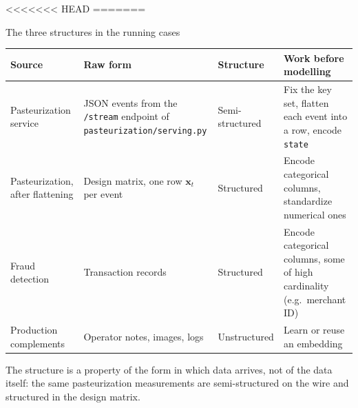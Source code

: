 <<<<<<< HEAD
=======
\begin{frame}{The three structures in the running cases}
\begingroup\footnotesize
\renewcommand{\arraystretch}{1.4}
\begin{tabularx}{\textwidth}{>{\raggedright\arraybackslash}p{} >{\raggedright\arraybackslash}X l >{\raggedright\arraybackslash}X}
\bfseries Source & \bfseries Raw form & \bfseries Structure & \bfseries Work before modelling \\
\toprule
Pasteurization service & JSON events from the \texttt{/stream} endpoint of \texttt{pasteurization/serving.py} & Semi-structured & Fix the key set, flatten each event into a row, encode \texttt{state} \\
Pasteurization, after flattening & Design matrix, one row $\mathbf{x}_t$ per event & Structured & Encode categorical columns, standardize numerical ones \\
Fraud detection & Transaction records & Structured & Encode categorical columns, some of high cardinality (e.g.\ merchant ID) \\
Production complements & Operator notes, images, logs & Unstructured & Learn or reuse an embedding \\
\bottomrule
\end{tabularx}
\par\endgroup
\vspace{0.6em}
\begingroup\small
The structure is a property of the form in which data arrives, not of the data itself: the same pasteurization measurements are semi-structured on the wire and structured in the design matrix.
\par\endgroup
\coursefooter
\end{frame}

